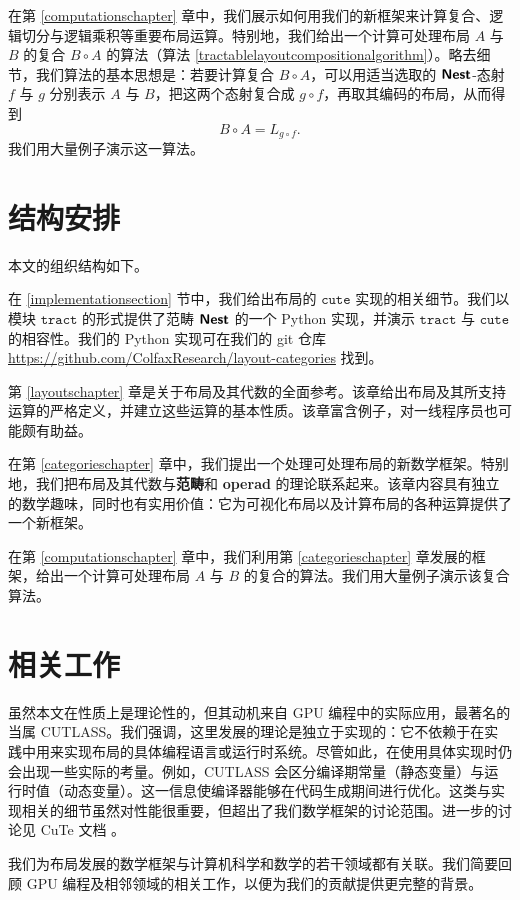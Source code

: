 在第 \ref{computationschapter} 章中，我们展示如何用我们的新框架来计算复合、逻辑切分与逻辑乘积等重要布局运算。特别地，我们给出一个计算可处理布局 $A$ 与 $B$ 的复合 $B \circ A$ 的算法（算法 \ref{tractablelayoutcompositionalgorithm}）。略去细节，我们算法的基本思想是：若要计算复合 $B \circ A$，可以用适当选取的 ${\boldsymbol{\mathsf{Nest}}}$-态射 $f$ 与 $g$ 分别表示 $A$ 与 $B$，把这两个态射复合成 $g \circ f$，再取其编码的布局，从而得到
\[
B \circ A = L_{g \circ f}.
\]
我们用大量例子演示这一算法。

\section{结构安排}

本文的组织结构如下。 

在 \ref{implementationsection} 节中，我们给出布局的 $\texttt{cute}$ 实现的相关细节。我们以模块 $\texttt{tract}$ 的形式提供了范畴 ${\boldsymbol{\mathsf{Nest}}}$ 的一个 Python 实现，并演示 $\texttt{tract}$ 与 $\texttt{cute}$ 的相容性。我们的 Python 实现可在我们的 git 仓库 \url{https://github.com/ColfaxResearch/layout-categories} 找到。

第 \ref{layoutschapter} 章是关于布局及其代数的全面参考。该章给出布局及其所支持运算的严格定义，并建立这些运算的基本性质。该章富含例子，对一线程序员也可能颇有助益。 

在第 \ref{categorieschapter} 章中，我们提出一个处理可处理布局的新数学框架。特别地，我们把布局及其代数与{\bf 范畴}和 {\bf operad} 的理论联系起来。该章内容具有独立的数学趣味，同时也有实用价值：它为可视化布局以及计算布局的各种运算提供了一个新框架。  

在第 \ref{computationschapter} 章中，我们利用第 \ref{categorieschapter} 章发展的框架，给出一个计算可处理布局 $A$ 与 $B$ 的复合的算法。我们用大量例子演示该复合算法。

\section{相关工作}

虽然本文在性质上是理论性的，但其动机来自 GPU 编程中的实际应用，最著名的当属 CUTLASS。我们强调，这里发展的理论是独立于实现的：它不依赖于在实践中用来实现布局的具体编程语言或运行时系统。尽管如此，在使用具体实现时仍会出现一些实际的考量。例如，CUTLASS 会区分编译期常量（静态变量）与运行时值（动态变量）。这一信息使编译器能够在代码生成期间进行优化。这类与实现相关的细节虽然对性能很重要，但超出了我们数学框架的讨论范围。进一步的讨论见 CuTe 文档 \cite{cutedocumentation}。

我们为布局发展的数学框架与计算机科学和数学的若干领域都有关联。我们简要回顾 GPU 编程及相邻领域的相关工作，以便为我们的贡献提供更完整的背景。

